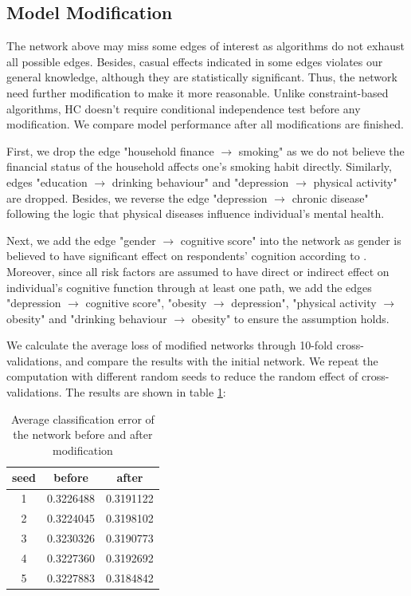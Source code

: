 \documentclass[11pt,twoside]{article}
\numberwithin{Theorem}{section}
\numberwithin{Definition}{section}
\numberwithin{Lemma}{section}
\numberwithin{Algorithm}{section}
\numberwithin{equation}{section}
\begin{document}
\subsection{Model Modification}

 The network above may miss some edges of interest as algorithms do not exhaust all possible edges. Besides, casual effects indicated in some edges violates our general knowledge, although they are statistically significant. Thus, the network need further modification to make it more reasonable. Unlike constraint-based algorithms, HC doesn't require conditional independence test before any modification. We compare model performance after all modifications are finished.

First, we drop the edge "household finance $\rightarrow$ smoking" as we do not believe the financial status of the household affects one's smoking habit directly. Similarly, edges "education $\rightarrow$ drinking behaviour" and "depression $\rightarrow$ physical activity" are dropped. Besides, we reverse the edge "depression $\rightarrow$ chronic disease" following the logic that physical diseases influence individual's mental health.

Next, we add the edge "gender $\rightarrow$ cognitive score" into the network as gender is believed to have significant effect on respondents' cognition according to \cite{beam2018differences}. Moreover, since all risk factors are assumed to have direct or indirect effect on individual's cognitive function through at least one path, we add the edges "depression $\rightarrow$ cognitive score", "obesity $\rightarrow$ depression", "physical activity $\rightarrow$ obesity" and "drinking behaviour $\rightarrow$ obesity" to ensure the assumption holds. 

We calculate the average loss of modified networks through 10-fold cross-validations, and compare the results with the initial network. We repeat the computation with different random seeds to reduce the random effect of cross-validations. The results are shown in table \ref{tab:hc}:

\begin{table}[!h]
	\centering
	\begin{tabular}{|c|c|c|}
		\hline
		seed & before & after \\
		\hline
		1 & 0.3226488 & 0.3191122 \\
		2 & 0.3224045 & 0.3198102 \\
		3 & 0.3230326 & 0.3190773 \\
		4 & 0.3227360 & 0.3192692 \\
		5 & 0.3227883 & 0.3184842 \\
		\hline
	\end{tabular}
	\caption{Average classification error of the network before and after modification}
	\label{tab:hc}
\end{table}
\end{document}
